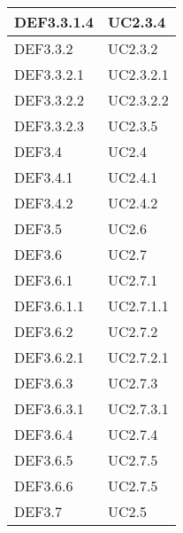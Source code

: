 \documentclass{scalatekids-article}
\begin{document}
\begin{longtable}[H]{|p{5.5cm}|p{5.5cm}|}
  \hline
  DEF3.3.1.4 & \multiLineCell[t]{UC2.3.4\\}\\
  \hline
  DEF3.3.2 & \multiLineCell[t]{UC2.3.2\\}\\
  \hline
  DEF3.3.2.1 & \multiLineCell[t]{UC2.3.2.1\\}\\
  \hline
  DEF3.3.2.2 & \multiLineCell[t]{UC2.3.2.2\\}\\
  \hline
  DEF3.3.2.3 & \multiLineCell[t]{UC2.3.5\\}\\
  \hline
  DEF3.4 & \multiLineCell[t]{UC2.4\\}\\
  \hline
  DEF3.4.1 & \multiLineCell[t]{UC2.4.1\\}\\
  \hline
  DEF3.4.2 & \multiLineCell[t]{UC2.4.2\\}\\
  \hline
  DEF3.5 & \multiLineCell[t]{UC2.6\\}\\
  \hline
  DEF3.6 & \multiLineCell[t]{UC2.7\\}\\
  \hline
  DEF3.6.1 & \multiLineCell[t]{UC2.7.1\\}\\
  \hline
  DEF3.6.1.1 & \multiLineCell[t]{UC2.7.1.1\\}\\
  \hline
  DEF3.6.2 & \multiLineCell[t]{UC2.7.2\\}\\
  \hline
  DEF3.6.2.1 & \multiLineCell[t]{UC2.7.2.1\\}\\
  \hline
  DEF3.6.3 & \multiLineCell[t]{UC2.7.3\\}\\
  \hline
  DEF3.6.3.1 & \multiLineCell[t]{UC2.7.3.1\\}\\
  \hline
  DEF3.6.4 & \multiLineCell[t]{UC2.7.4\\}\\
  \hline
  DEF3.6.5 & \multiLineCell[t]{UC2.7.5\\}\\
  \hline
  DEF3.6.6 & \multiLineCell[t]{UC2.7.5\\}\\
  \hline
  DEF3.7 & \multiLineCell[t]{UC2.5\\}\\

\end{longtable}
\end{document}
